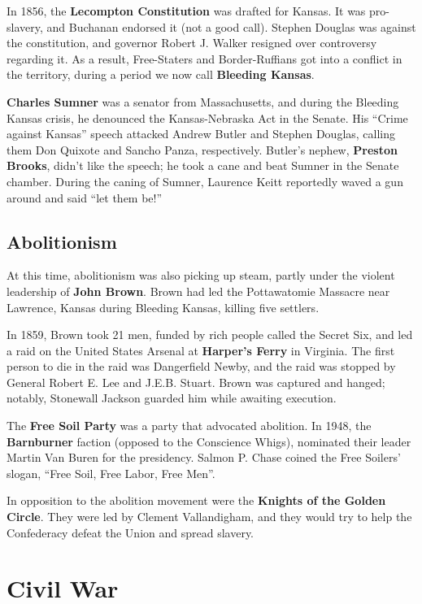 In 1856, the \textbf{Lecompton Constitution} was drafted for Kansas.
It was pro-slavery, and Buchanan endorsed it (not a good call).
Stephen Douglas was against the constitution,
and governor Robert J. Walker resigned over controversy regarding it.
As a result, Free-Staters and Border-Ruffians got into a conflict in the territory,
during a period we now call \textbf{Bleeding Kansas}.

\textbf{Charles Sumner} was a senator from Massachusetts,
and during the Bleeding Kansas crisis, he denounced the Kansas-Nebraska Act in the Senate.
His ``Crime against Kansas'' speech attacked Andrew Butler and Stephen Douglas,
calling them Don Quixote and Sancho Panza, respectively.
Butler's nephew, \textbf{Preston Brooks}, didn't like the speech;
he took a cane and beat Sumner in the Senate chamber.
During the caning of Sumner, Laurence Keitt reportedly waved a gun around and said ``let them be!''

\subsection*{Abolitionism}

At this time, abolitionism was also picking up steam,
partly under the violent leadership of \textbf{John Brown}.
Brown had led the Pottawatomie Massacre near Lawrence, Kansas
during Bleeding Kansas, killing five settlers.

In 1859, Brown took 21 men, funded by rich people called the Secret Six,
and led a raid on the United States Arsenal at \textbf{Harper's Ferry} in Virginia.
The first person to die in the raid was Dangerfield Newby,
and the raid was stopped by General Robert E. Lee and J.E.B. Stuart.
Brown was captured and hanged;
notably, Stonewall Jackson guarded him while awaiting execution.

The \textbf{Free Soil Party} was a party that advocated abolition.
In 1948, the \textbf{Barnburner} faction (opposed to the Conscience Whigs),
nominated their leader Martin Van Buren for the presidency.
Salmon P. Chase coined the Free Soilers' slogan, ``Free Soil, Free Labor, Free Men''.

In opposition to the abolition movement were the \textbf{Knights of the Golden Circle}.
They were led by Clement Vallandigham, and they would try to help the Confederacy defeat the Union
and spread slavery.

\section{Civil War}

